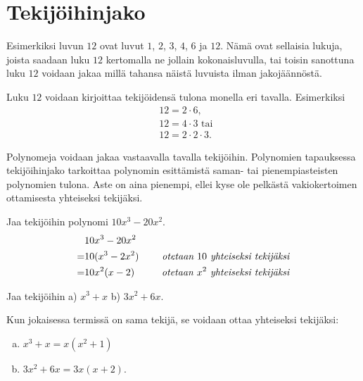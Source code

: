 \section{Tekijöihinjako}



Esimerkiksi luvun $12$  ovat luvut $1$, $2$, $3$, $4$, $6$ ja $12$. Nämä ovat sellaisia
lukuja, joista saadaan luku $12$ kertomalla ne jollain kokonaisluvulla, tai toisin sanottuna luku $12$ voidaan jakaa
millä tahansa näistä luvuista ilman jakojäännöstä.

\begin{esimerkki}
Luku $12$ voidaan kirjoittaa tekijöidensä tulona monella eri tavalla. Esimerkiksi
\begin{align*}
&12 = 2 \cdot 6, \\
&12= 4 \cdot 3 \text{ tai } \\
&12= 2 \cdot 2 \cdot 3.
\end{align*}
\end{esimerkki}

Polynomeja voidaan jakaa vastaavalla tavalla tekijöihin. Polynomien tapauksessa tekijöihinjako tarkoittaa
polynomin esittämistä saman- tai pienempiasteisten polynomien tulona. Aste on aina pienempi, ellei kyse ole pelkästä
vakiokertoimen ottamisesta yhteiseksi tekijäksi.

\begin{esimerkki}
Jaa tekijöihin polynomi $10x^3-20x^2$.
\begin{align*}
& 10x^3-20x^2 \\
=& 10(x^3-2x^2) \ \ \ \ &\emph{otetaan $10$ yhteiseksi tekijäksi} \\
=& 10x^2(x-2) &\emph{otetaan $x^2$ yhteiseksi tekijäksi} \\
\end{align*}
\end{esimerkki}

\begin{esimerkki}
Jaa tekijöihin \quad a) $x^3+x$ \quad b) $3x^2+6x.$

Kun jokaisessa termissä on sama tekijä, se voidaan ottaa yhteiseksi tekijäksi:
\begin{enumerate}[a)]
    \item $x^3+x = x(x^2+1)$
    \item $3x^2+6x = 3x(x+2)$.
\end{enumerate}
\end{esimerkki}

